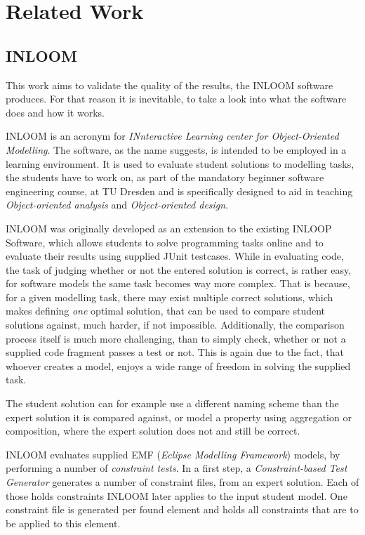 \chapter{Related Work}
\label{ch:related_work}

\section{INLOOM}
This work aims to validate the quality of the results, the INLOOM software \cite{1}
produces. For that reason it is inevitable, to take a look into what the software does and
how it works.

INLOOM is an acronym for \textit{INnteractive Learning center for Object-Oriented Modelling}. 
The software, as the name suggests, is intended to be employed in a learning environment.
It is used to evaluate student solutions to modelling tasks, the students have to work 
on, as part of the mandatory beginner software engineering course, at TU Dresden and 
is specifically designed to aid in teaching \textit{Object-oriented analysis} and 
\textit{Object-oriented design}.

INLOOM was originally developed as an extension to the existing INLOOP\cite{5} Software, 
which allows students to solve programming tasks online and to evaluate their results using
supplied JUnit testcases. While in evaluating code, the task of judging whether or not 
the entered solution is correct, is rather easy, for software models the same task becomes 
way more complex. That is because, for a given modelling task, there may exist multiple
correct solutions, which makes defining \textit{one} optimal solution, that can be used to 
compare student solutions against, much harder, if not impossible. Additionally, the comparison
process itself is much more challenging, than to simply check, whether or not a supplied
code fragment passes a test or not. This is again due to the fact, that whoever creates a model,
enjoys a wide range of freedom in solving the supplied task. 

The student solution can for example use a different naming scheme than the expert solution it 
is compared against, or model a property using aggregation or composition, where the expert 
solution does not and still be correct.

INLOOM evaluates supplied EMF (\textit{Eclipse Modelling Framework}) models, by performing
a number of \textit{constraint tests}. In a first step, a 
\textit{Constraint-based Test Generator} generates a number of constraint files, from an expert
solution. Each of those holds constraints INLOOM later applies to the input student model. 
One constraint file is generated per found element and holds all constraints that are to be 
applied to this element.

